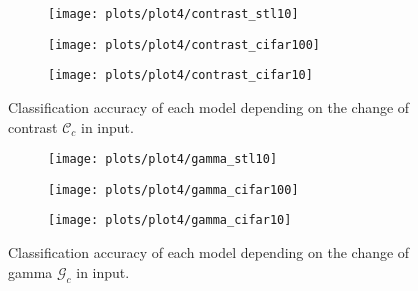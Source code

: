    \begin{figure}[h]
    \begin{adjustwidth}{-11em}{-11em}
        \centering
        \begin{subfigure}{0.6\textwidth}
            \texttt{[image: plots/plot4/contrast\_stl10]}
        \end{subfigure}
        \begin{subfigure}{0.6\textwidth}
            \texttt{[image: plots/plot4/contrast\_cifar100]}
        \end{subfigure}
        \begin{subfigure}{0.6\textwidth}
            \texttt{[image: plots/plot4/contrast\_cifar10]}
        \end{subfigure}
    \end{adjustwidth}
        \caption{Classification accuracy of each model depending on the change
        of contrast $\mathcal{C}_c$ in input.}
        \label{fig:plot4contrast}
    \end{figure}


    \begin{figure}[h]
    \begin{adjustwidth}{-11em}{-11em}
        \centering
        \begin{subfigure}{0.6\textwidth}
            \texttt{[image: plots/plot4/gamma\_stl10]}
        \end{subfigure}
        \begin{subfigure}{0.6\textwidth}
            \texttt{[image: plots/plot4/gamma\_cifar100]}
        \end{subfigure}
        \begin{subfigure}{0.6\textwidth}
            \texttt{[image: plots/plot4/gamma\_cifar10]}
        \end{subfigure}
    \end{adjustwidth}
        \caption{Classification accuracy of each model depending on the change
        of gamma $\mathcal{G}_c$ in input.}
        \label{fig:plot4contrast}
    \end{figure}


